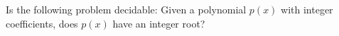 Is the following problem decidable:
Given a polynomial $p(x)$ with integer coefficients,
does $p(x)$ have an integer root?
